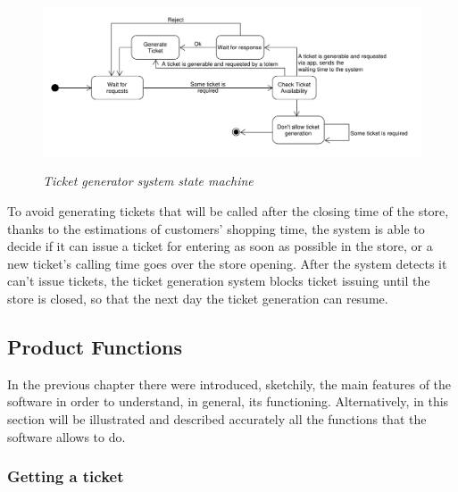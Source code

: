 \documentclass{article}
\begin{document}
		\bigskip
		
		\begin{figure}[!h]
			
			\centering
			\hspace*{-2cm}\includegraphics[scale=0.5]{StateCharts/ticket_generation_system.pdf} \\
			\caption{\emph{Ticket generator system state machine}}
			
		\end{figure}
	
		To avoid generating tickets that will be called after the closing time of the store, thanks to the estimations of customers' shopping time, the system is able to decide if it can issue a ticket for entering as soon as possible in the store, or a new ticket's calling time goes over the store opening. After the system detects it can't issue tickets, the ticket generation system blocks ticket issuing until the store is closed, so that the next day the ticket generation can resume.

	

	\newpage
	\subsection{Product Functions}
		
	In the previous chapter there were introduced, sketchily, the main features of the software in order to understand, in general, its functioning. Alternatively, in this section will be illustrated and described accurately all the functions that the software allows to do.
	
		\subsubsection{Getting a ticket}
		
\end{document}
